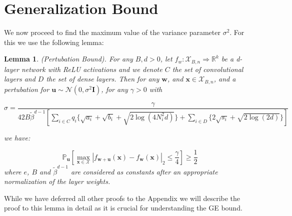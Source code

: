 \documentclass{article} %
\newtheorem{lemma}[theorem]{Lemma}
\theoremstyle{definition}
\begin{document}
\section{Generalization Bound}

We now proceed to find the maximum value of the variance parameter $\sigma^2$. For this we use the following lemma:

\begin{lemma}
(Pertubation Bound). For any $B,d > 0$, let $f_w:\mathcal{X}_{B,n} \Rightarrow \mathbb{R}^k$ be a d-layer network with ReLU activations and we denote $C$ the set of convolutional layers and $D$ the set of dense layers. Then for any $\boldsymbol{w}$, and $\boldsymbol{x} \in \mathcal{X}_{B,n}$, and a pertubation for $\boldsymbol{u} \sim \mathcal{N}(0,\sigma^2 \boldsymbol{I})$, for any $\gamma > 0$ with 

\begin{equation}
\sigma  = \frac{\gamma}{42 B \tilde{\beta}^{d-1} [\sum_{i \in C} q_i \{\sqrt{a_i}+\sqrt{b_i}+\sqrt{2\log(4N_i^2d)} \} + \sum_{i \in D} \{2\sqrt{s_i}+\sqrt{2\log(2d)} \}]}  
\end{equation}


we have:

\begin{equation}
	\mathbb{P}_{\boldsymbol{u}}[\max_{\boldsymbol{x \in \mathcal{X}}} |f_{\boldsymbol{w}+\boldsymbol{u} }(\boldsymbol{x})-f_{\boldsymbol{w}}(\boldsymbol{x})|_2 \leq \frac{\gamma}{4} ] \geq \frac{1}{2}
\end{equation}
where $e$, $B$ and $\tilde{\beta}^{d-1}$ are considered as constants after an appropriate normalization of the layer weights. 
\end{lemma}

While we have deferred all other proofs to the Appendix we will describe the proof to this lemma in detail as it is crucial for understanding the GE bound.
\end{document}
